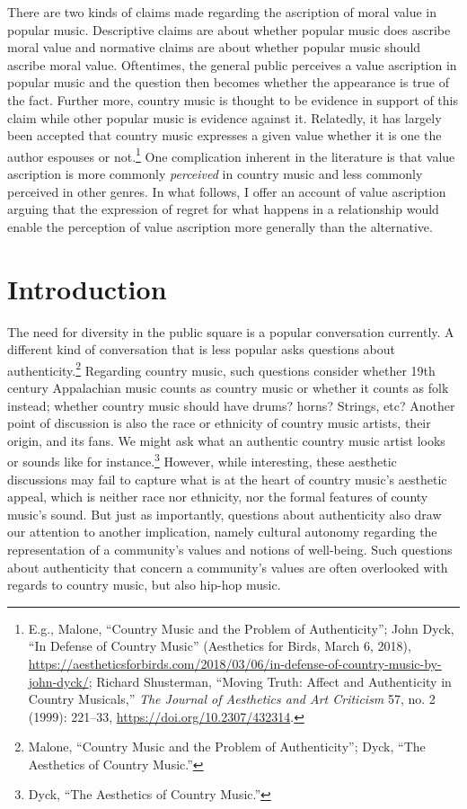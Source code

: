 \documentclass[phdthesis,12pt,final,a4paper]{wuthesis}
\theoremstyle{definition}
\theoremstyle{definition}
\theoremstyle{definition}
\theoremstyle{definition}
\theoremstyle{remark}
\begin{document}
There are two kinds of claims made regarding the ascription of moral value in popular music. Descriptive claims are about whether popular music does ascribe moral value and normative claims are about whether popular music should ascribe moral value. Oftentimes, the general public perceives a value ascription in popular music and the question then becomes whether the appearance is true of the fact. Further more, country music is thought to be evidence in support of this claim while other popular music is evidence against it. Relatedly, it has largely been accepted that country music expresses a given value whether it is one the author espouses or not.\footnote{E.g., Malone, {``Country {Music} and the {Problem} of {Authenticity}''}; John Dyck, {``In Defense of Country Music''} (Aesthetics for Birds, March 6, 2018), \url{https://aestheticsforbirds.com/2018/03/06/in-defense-of-country-music-by-john-dyck/}; Richard Shusterman, {``Moving {Truth}: {Affect} and {Authenticity} in {Country Musicals},''} \emph{The Journal of Aesthetics and Art Criticism} 57, no. 2 (1999): 221--33, \url{https://doi.org/10.2307/432314}.} One complication inherent in the literature is that value ascription is more commonly \emph{perceived} in country music and less commonly perceived in other genres. In what follows, I offer an account of value ascription arguing that the expression of regret for what happens in a relationship would enable the perception of value ascription more generally than the alternative.

\section{Introduction}\label{introduction-1}

The need for diversity in the public square is a popular conversation currently. A different kind of conversation that is less popular asks questions about authenticity.\footnote{Malone, {``Country {Music} and the {Problem} of {Authenticity}''}; Dyck, {``The Aesthetics of Country Music.''}} Regarding country music, such questions consider whether 19th century Appalachian music counts as country music or whether it counts as folk instead; whether country music should have drums? horns? Strings, etc? Another point of discussion is also the race or ethnicity of country music artists, their origin, and its fans. We might ask what an authentic country music artist looks or sounds like for instance.\footnote{Dyck, {``The Aesthetics of Country Music.''}} However, while interesting, these aesthetic discussions may fail to capture what is at the heart of country music's aesthetic appeal, which is neither race nor ethnicity, nor the formal features of county music's sound. But just as importantly, questions about authenticity also draw our attention to another implication, namely cultural autonomy regarding the representation of a community's values and notions of well-being. Such questions about authenticity that concern a community's values are often overlooked with regards to country music, but also hip-hop music.
\end{document}
